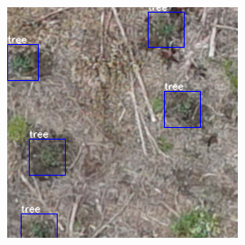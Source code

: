 \documentclass[a4paper, 12pt]{report}
\begin{document}
\begin{enumerate}[label= \textit{\alph*)}]
\begin{figure}[!h]
\begin{subfigure}[!h]{0.45\textwidth}
        \label{fig:subfig1}
    \end{subfigure}%
    \quad
    \begin{subfigure}[!h]{0.45\textwidth}
    \includegraphics[width=\linewidth]{Images/split2}
        \label{fig:subfig2}
    \end{subfigure}
 

\end{figure}
\end{enumerate}
\end{document}
